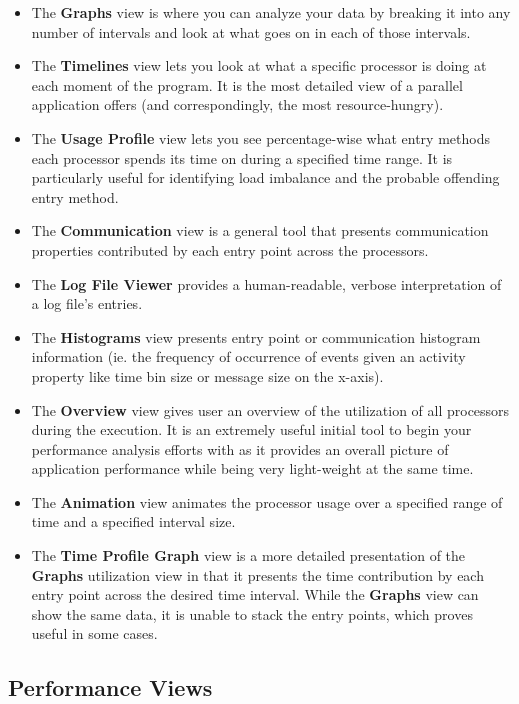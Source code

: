 \documentclass[10pt]{article}
\begin{document}
\begin{itemize}
\item 
The {\bf Graphs} view is where you can analyze your data by breaking it
into any number of intervals and look at what goes on in each of those
intervals.
\item
The {\bf Timelines} view lets you look at what a specific processor is
doing at each moment of the program. It is the most detailed view of a
parallel application \projections{} offers (and correspondingly, the
most resource-hungry).
\item
The {\bf Usage Profile} view lets you see percentage-wise what entry
methods each processor spends its time on during a specified time range.
It is particularly useful for identifying load imbalance and the probable
offending entry method.
\item
The {\bf Communication} view is a general tool that presents
communication properties contributed by each entry point across the
processors.
\item
The {\bf Log File Viewer} provides a human-readable, verbose
interpretation of a log file's entries.
\item
The {\bf Histograms} view presents entry point or communication
histogram information (ie. the frequency of occurrence of events given
an activity property like time bin size or message size on the
x-axis).
\item
The {\bf Overview} view gives user an overview of the utilization of
all processors during the execution. It is an extremely useful initial
tool to begin your performance analysis efforts with as it provides an
overall picture of application performance while being very
light-weight at the same time.
\item
The {\bf Animation} view animates the processor usage over a specified
range of time and a specified interval size.
\item
The {\bf Time Profile Graph} view is a more detailed presentation of
the {\bf Graphs} utilization view in that it presents the time
contribution by each entry point across the desired time
interval. While the {\bf Graphs} view can show the same data, it is
unable to stack the entry points, which proves useful in some cases.
\end{itemize}

\subsection{Performance Views}
\end{document}
